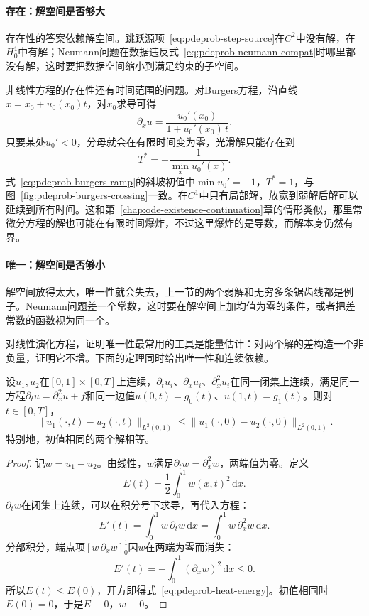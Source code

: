 \paragraph{存在：解空间是否够大}
存在性的答案依赖解空间。跳跃源项~\eqref{eq:pdeprob-step-source}在$C^{2}$中没有解，在$H_0^{1}$中有解；Neumann问题在数据违反式~\eqref{eq:pdeprob-neumann-compat}时哪里都没有解，这时要把数据空间缩小到满足约束的子空间。

非线性方程的存在性还有时间范围的问题。对Burgers方程，沿直线$x=x_0+u_0(x_0)t$，对$x_0$求导可得
\[
  \partial_xu=\frac{u_0'(x_0)}{1+u_0'(x_0)\,t}.
\]
只要某处$u_0'<0$，分母就会在有限时间变为零，光滑解只能存在到
\begin{equation}
  T^{*}=-\frac{1}{\min_xu_0'(x)}.
  \label{eq:pdeprob-burgers-breaking}
\end{equation}
式~\eqref{eq:pdeprob-burgers-ramp}的斜坡初值中$\min u_0'=-1$，$T^{*}=1$，与图~\ref{fig:pdeprob-burgers-crossing}一致。在$C^{1}$中只有局部解，放宽到弱解后解可以延续到所有时间。这和第~\ref{chap:ode-existence-continuation}章的情形类似，那里常微分方程的解也可能在有限时间爆炸，不过这里爆炸的是导数，而解本身仍然有界。

\paragraph{唯一：解空间是否够小}
解空间放得太大，唯一性就会失去，上一节的两个弱解和无穷多条锯齿线都是例子。Neumann问题差一个常数，这时要在解空间上加均值为零的条件，或者把差常数的函数视为同一个。

对线性演化方程，证明唯一性最常用的工具是能量估计：对两个解的差构造一个非负量，证明它不增。下面的定理同时给出唯一性和连续依赖。

\begin{theorem}[细棒热方程的能量估计]
\label{thm:pdeprob-heat-energy}
设$u_1,u_2$在$[0,1]\times[0,T]$上连续，$\partial_tu_i$、$\partial_xu_i$、$\partial_x^{2}u_i$在同一闭集上连续，满足同一方程$\partial_tu=\partial_x^{2}u+f$和同一边值$u(0,t)=g_0(t)$、$u(1,t)=g_1(t)$。则对$t\in[0,T]$，
\begin{equation}
  \lVert u_1(\cdot,t)-u_2(\cdot,t)\rVert_{L^{2}(0,1)}\leq\lVert u_1(\cdot,0)-u_2(\cdot,0)\rVert_{L^{2}(0,1)}.
  \label{eq:pdeprob-heat-energy}
\end{equation}
特别地，初值相同的两个解相等。
\end{theorem}

\begin{proof}
记$w=u_1-u_2$。由线性，$w$满足$\partial_tw=\partial_x^{2}w$，两端值为零。定义
\[
  E(t)=\frac12\int_0^{1}w(x,t)^{2}\,\mathrm{d}x.
\]
$\partial_tw$在闭集上连续，可以在积分号下求导，再代入方程：
\[
  E'(t)=\int_0^{1}w\,\partial_tw\,\mathrm{d}x=\int_0^{1}w\,\partial_x^{2}w\,\mathrm{d}x.
\]
分部积分，端点项$[w\,\partial_xw]_0^{1}$因$w$在两端为零而消失：
\[
  E'(t)=-\int_0^{1}(\partial_xw)^{2}\,\mathrm{d}x\leq0.
\]
所以$E(t)\leq E(0)$，开方即得式~\eqref{eq:pdeprob-heat-energy}。初值相同时$E(0)=0$，于是$E\equiv0$，$w\equiv0$。
\end{proof}

